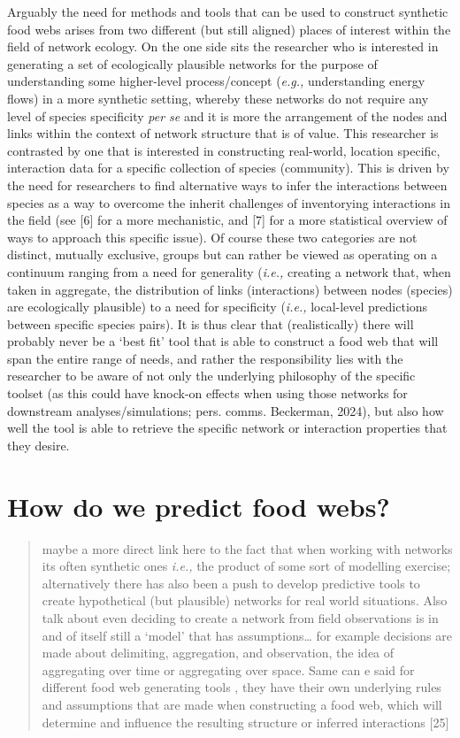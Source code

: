 \documentclass[
]{article}
\begin{document}
Arguably the need for methods and tools that can be used to construct
synthetic food webs arises from two different (but still aligned) places
of interest within the field of network ecology. On the one side sits
the researcher who is interested in generating a set of ecologically
plausible networks for the purpose of understanding some higher-level
process/concept (\emph{e.g.,} understanding energy flows) in a more
synthetic setting, whereby these networks do not require any level of
species specificity \emph{per se} and it is more the arrangement of the
nodes and links within the context of network structure that is of
value. This researcher is contrasted by one that is interested in
constructing real-world, location specific, interaction data for a
specific collection of species (community). This is driven by the need
for researchers to find alternative ways to infer the interactions
between species as a way to overcome the inherit challenges of
inventorying interactions in the field (see {[}6{]} for a more
mechanistic, and {[}7{]} for a more statistical overview of ways to
approach this specific issue). Of course these two categories are not
distinct, mutually exclusive, groups but can rather be viewed as
operating on a continuum ranging from a need for generality
(\emph{i.e.,} creating a network that, when taken in aggregate, the
distribution of links (interactions) between nodes (species) are
ecologically plausible) to a need for specificity (\emph{i.e.,}
local-level predictions between specific species pairs). It is thus
clear that (realistically) there will probably never be a `best fit'
tool that is able to construct a food web that will span the entire
range of needs, and rather the responsibility lies with the researcher
to be aware of not only the underlying philosophy of the specific
toolset (as this could have knock-on effects when using those networks
for downstream analyses/simulations; pers. comms. Beckerman, 2024), but
also how well the tool is able to retrieve the specific network or
interaction properties that they desire.

\section{How do we predict food webs?}\label{sec-network-build}

\begin{quote}
maybe a more direct link here to the fact that when working with
networks its often synthetic ones \emph{i.e.,} the product of some sort
of modelling exercise; alternatively there has also been a push to
develop predictive tools to create hypothetical (but plausible) networks
for real world situations. Also talk about even deciding to create a
network from field observations is in and of itself still a `model' that
has assumptions\ldots{} for example decisions are made about delimiting,
aggregation, and observation, the idea of aggregating over time or
aggregating over space. Same can e said for different food web
generating tools , they have their own underlying rules and assumptions
that are made when constructing a food web, which will determine and
influence the resulting structure or inferred interactions {[}25{]}
\end{quote}
\end{document}
